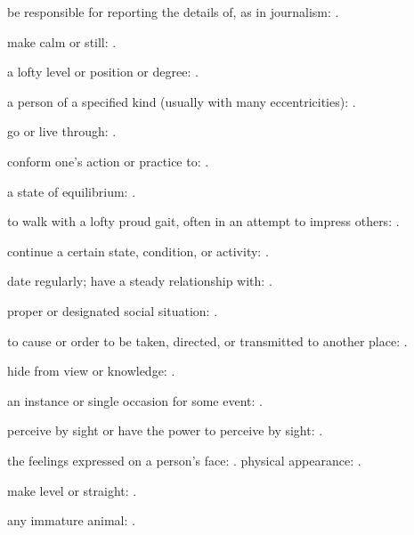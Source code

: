  be responsible for reporting the details of, as in journalism:   .

  make calm or still:   .

  a lofty level or position or degree: .

  a person of a specified kind (usually with many eccentricities):   .

  go or live through:   .

  conform one's action or practice to:   .

  a state of equilibrium: .

  to walk with a lofty proud gait, often in an attempt to impress others:   .

  continue a certain state, condition, or activity:   .

  date regularly; have a steady relationship with:   .

  proper or designated social situation:   .

  to cause or order to be taken, directed, or transmitted to another place:   .

  hide from view or knowledge:   .

  an instance or single occasion for some event:   .

  perceive by sight or have the power to perceive by sight: .

  the feelings expressed on a person's face:   . physical appearance: .

  make level or straight:   .

  any immature animal:   .

